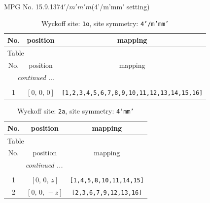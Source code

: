 \documentclass[fleqn,8pt]{jsarticle}
\begin{document}
\setcounter{MaxMatrixCols}{32}

\renewcommand{\tablename}{Table~}
\renewcommand{\figurename}{Figure~}
\begin{center}
\LARGE
MPG No. 15.9.137\quad$4'/m'm'm$\quad(4'/m'mm' setting)
\end{center}
\renewcommand{\arraystretch}{1.2}
\begin{longtable}{ccc}
\caption{Wyckoff site: {\tt 1o}, site symmetry: {\tt 4'/m'mm'}}
 \\
 \hline \hline
No. & position & mapping \\ \hline \endfirsthead

\multicolumn{2}{l}{\tablename\ \thetable{}} \\
 \hline \hline
No. & position & mapping \\ \hline \endhead

 \hline \hline
\multicolumn{2}{r}{\footnotesize\it continued ...} \\ \endfoot

 \hline \hline
\multicolumn{2}{r}{} \\ \endlastfoot

1 & $\left[ 0,\, 0,\, 0 \right]$ & {\tt [1,2,3,4,5,6,7,8,9,10,11,12,13,14,15,16]} \\
\end{longtable}
\renewcommand{\arraystretch}{1.2}
\begin{longtable}{ccc}
\caption{Wyckoff site: {\tt 2a}, site symmetry: {\tt 4'mm'}}
 \\
 \hline \hline
No. & position & mapping \\ \hline \endfirsthead

\multicolumn{2}{l}{\tablename\ \thetable{}} \\
 \hline \hline
No. & position & mapping \\ \hline \endhead

 \hline \hline
\multicolumn{2}{r}{\footnotesize\it continued ...} \\ \endfoot

 \hline \hline
\multicolumn{2}{r}{} \\ \endlastfoot

1 & $\left[ 0,\, 0,\, z \right]$ & {\tt [1,4,5,8,10,11,14,15]} \\ \hline
2 & $\left[ 0,\, 0,\, - z \right]$ & {\tt [2,3,6,7,9,12,13,16]} \\
\end{longtable}
\renewcommand{\arraystretch}{1.2}
\end{document}
